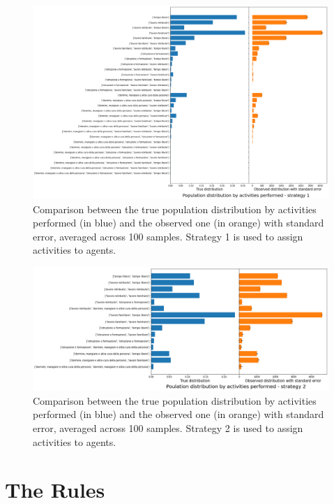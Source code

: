 \begin{figure}
    \centering
    \includegraphics[scale = 0.35]{tex/pics/pop_by_act.png}
    \caption{Comparison between the true population distribution by activities performed (in blue) and the observed one (in orange) with standard error, averaged across 100 samples. Strategy 1 is used to assign activities to agents.}
    \label{pop_act}
\end{figure}

\begin{figure}
    \centering
    \includegraphics[scale = 0.4]{tex/pics/pop_by_act2.png}
    \caption{Comparison between the true population distribution by activities performed (in blue) and the observed one (in orange) with standard error, averaged across 100 samples. Strategy 2 is used to assign activities to agents.}
    \label{pop_act2}
\end{figure}


\section{The Rules}\label{sec:3.4}

